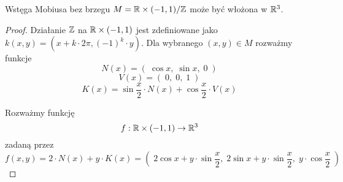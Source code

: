 \begin{example}
  \item Wstęga Mobiusa bez brzegu $M=\mathbb{R}\times(-1,1)/\mathbb{Z}$ może być włożona w $\mathbb{R}^3$.

    \begin{proof}
      Działanie $\mathbb{Z}$ na $\mathbb{R}\times(-1,1)$ jest zdefiniowane jako $k(x,y)=(x+k\cdot2\pi, (-1)^k\cdot y)$. Dla wybranego $(x,y)\in M$ rozważmy funkcje
      $$N(x)=(\;\cos x,\; \sin x,\; 0\;)$$
      $$V(x)=(\;0,\;0,\;1\;)$$
      $$K(x)=\sin \frac{x}{2}\cdot N(x)+\cos \frac{x}{2}\cdot V(x)$$

      Rozważmy funkcję 
      $$f:\mathbb{R}\times(-1,1)\to\mathbb{R}^3$$
      zadaną przez
      $$f(x,y)=2\cdot N(x)+y\cdot K(x)=(\;2\cos x+ y\cdot\sin\frac{x}{2},\; 2\sin x+y\cdot\sin\frac{x}{2},\; y\cdot\cos\frac{x}{2}\;)$$





\end{proof}
\end{example}
